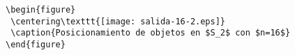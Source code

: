 \documentclass[letterpaper,12pt]{article}
\begin{document}
\pagestyle{empty}
\thispagestyle{empty}

\noindent

\begin{verbatim}
\begin{figure}
 \centering\texttt{[image: salida-16-2.eps]}
 \caption{Posicionamiento de objetos en $S_2$ con $n=16$}
\end{figure}
\end{verbatim}  
  
\end{document}
